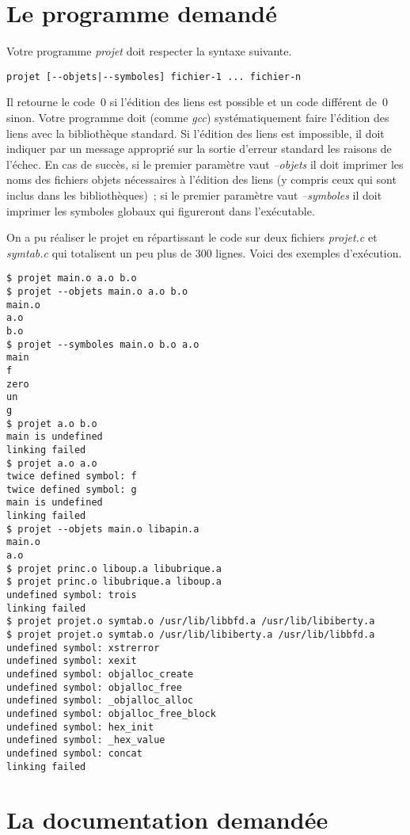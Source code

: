 \documentclass{article}
\begin{document}
\section{Le programme demand{\'e}}

Votre programme {\em projet} doit respecter la syntaxe suivante.

\begin{verbatim}
projet [--objets|--symboles] fichier-1 ... fichier-n
\end{verbatim}

Il retourne le code~$0$ si l'{\'e}dition des liens est possible et 
un code diff{\'e}rent de~$0$ sinon. Votre programme doit (comme {\em gcc})
syst{\'e}matiquement faire l'{\'e}dition des liens avec la biblioth{\`e}que standard.
Si l'{\'e}dition des liens est impossible,
il doit indiquer par un message appropri{\'e} sur la sortie d'erreur
standard les raisons de l'{\'e}chec. En cas de succ{\`e}s, si le premier param{\`e}tre vaut
{\em --objets} il doit imprimer les noms des fichiers objets n{\'e}cessaires
{\`a} l'{\'e}dition des liens (y compris ceux qui sont inclus dans les biblioth{\`e}ques)~;
si le premier param{\`e}tre vaut {\em --symboles} il doit 
imprimer les symboles globaux qui figureront dans l'ex{\'e}cutable. 

On a pu r{\'e}aliser le projet en r{\'e}partissant le code sur deux fichiers 
{\em projet.c} et {\em symtab.c} qui totalisent un peu plus de 300 lignes.
Voici des exemples d'ex{\'e}cution.

\begin{verbatim}
$ projet main.o a.o b.o
$ projet --objets main.o a.o b.o
main.o
a.o
b.o
$ projet --symboles main.o b.o a.o
main
f
zero
un
g
$ projet a.o b.o
main is undefined
linking failed
$ projet a.o a.o
twice defined symbol: f
twice defined symbol: g
main is undefined
linking failed
$ projet --objets main.o libapin.a
main.o
a.o
$ projet princ.o liboup.a libubrique.a
$ projet princ.o libubrique.a liboup.a
undefined symbol: trois
linking failed
$ projet projet.o symtab.o /usr/lib/libbfd.a /usr/lib/libiberty.a
$ projet projet.o symtab.o /usr/lib/libiberty.a /usr/lib/libbfd.a
undefined symbol: xstrerror
undefined symbol: xexit
undefined symbol: objalloc_create
undefined symbol: objalloc_free
undefined symbol: _objalloc_alloc
undefined symbol: objalloc_free_block
undefined symbol: hex_init
undefined symbol: _hex_value
undefined symbol: concat
linking failed
\end{verbatim}

\section{La documentation demand{\'e}e}
\end{document}

